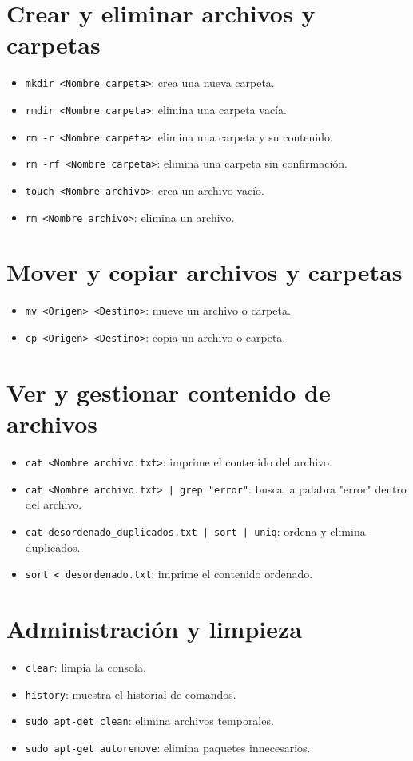 \documentclass{article}
\begin{document}
\section{Crear y eliminar archivos y carpetas}
\begin{itemize}
    \item \texttt{mkdir <Nombre carpeta>}: crea una nueva carpeta.
    \item \texttt{rmdir <Nombre carpeta>}: elimina una carpeta vacía.
    \item \texttt{rm -r <Nombre carpeta>}: elimina una carpeta y su contenido.
    \item \texttt{rm -rf <Nombre carpeta>}: elimina una carpeta sin confirmación.
    \item \texttt{touch <Nombre archivo>}: crea un archivo vacío.
    \item \texttt{rm <Nombre archivo>}: elimina un archivo.
\end{itemize}

\section{Mover y copiar archivos y carpetas}
\begin{itemize}
    \item \texttt{mv <Origen> <Destino>}: mueve un archivo o carpeta.
    \item \texttt{cp <Origen> <Destino>}: copia un archivo o carpeta.
\end{itemize}

\section{Ver y gestionar contenido de archivos}
\begin{itemize}
    \item \texttt{cat <Nombre archivo.txt>}: imprime el contenido del archivo.
    \item \texttt{cat <Nombre archivo.txt> | grep "error"}: busca la palabra "error" dentro del archivo.
    \item \texttt{cat desordenado\_duplicados.txt | sort | uniq}: ordena y elimina duplicados.
    \item \texttt{sort < desordenado.txt}: imprime el contenido ordenado.
\end{itemize}


\section{Administración y limpieza}
\begin{itemize}
    \item \texttt{clear}: limpia la consola.
    \item \texttt{history}: muestra el historial de comandos.
    \item \texttt{sudo apt-get clean}: elimina archivos temporales.
    \item \texttt{sudo apt-get autoremove}: elimina paquetes innecesarios.
\end{itemize}
\end{document}
